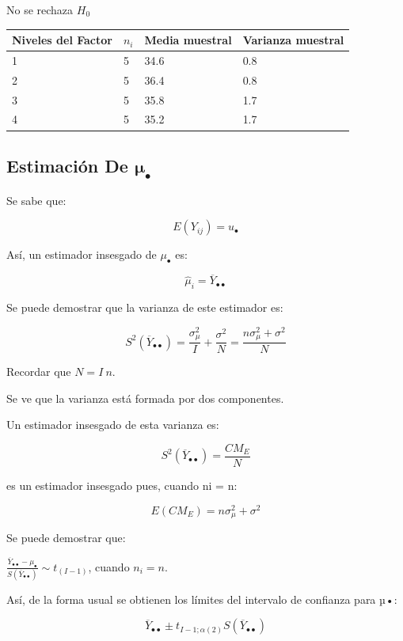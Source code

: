 \documentclass[]{book}
\theoremstyle{definition}
\theoremstyle{definition}
\theoremstyle{definition}
\theoremstyle{remark}
\begin{document}
No se rechaza \(H_0\)

\begin{longtable}[]{@{}llll@{}}
\toprule
Niveles del Factor & \(n_{i}\) & Media muestral & Varianza
muestral\tabularnewline
\midrule
\endhead
1 & 5 & 34.6 & 0.8\tabularnewline
2 & 5 & 36.4 & 0.8\tabularnewline
3 & 5 & 35.8 & 1.7\tabularnewline
4 & 5 & 35.2 & 1.7\tabularnewline
\bottomrule
\end{longtable}

\hypertarget{estimacion-de-mathbfmu_mathbfbullet}{%
\subsection{\texorpdfstring{Estimación De
\(\mathbf{\mu}_{\mathbf{\bullet}}\)}{Estimación De \textbackslash{}mathbf\{\textbackslash{}mu\}\_\{\textbackslash{}mathbf\{\textbackslash{}bullet\}\}}}\label{estimacion-de-mathbfmu_mathbfbullet}}

Se sabe que:

\[
E(Y_{ij}) = u_{\bullet}
\]

Así, un estimador insesgado de \(\mu_{\bullet}\) es:

\[
{\hat{\mu}}_{i} = {\overline{Y}}_{\bullet\bullet}
\]

Se puede demostrar que la varianza de este estimador es:

\[
S^{2}\left( {\overline{Y}}_{\bullet\bullet} \right) = \frac{\sigma_{\mu}^{2}}{I} + \frac{\sigma^{2}}{N} = \frac{n\sigma_{\mu}^{2} + \sigma^{2}}{N}
\]

Recordar que \(N = I\ n.\)

Se ve que la varianza está formada por dos componentes.

Un estimador insesgado de esta varianza es:

\[
S^{2}\left( {\overline{Y}}_{\bullet\bullet} \right) = \frac{CM_E}{N}
\]

es un estimador insesgado pues, cuando ni = n:

\[
E\left( CM_E \right) = n\sigma_{\mu}^{2} + \sigma^{2}
\]

Se puede demostrar que:

\(\frac{{\overline{Y}}_{\bullet\bullet} - \mu_{\bullet}}{S\left( {\overline{Y}}_{\bullet\bullet} \right)}\sim t_{\left( I - 1 \right)}\),
cuando \(n_{i} = n.\)

Así, de la forma usual se obtienen los límites del intervalo de
confianza para µ•:

\[
{\overline{Y}}_{\bullet\bullet} \pm t_{I - 1;\alpha\left( 2 \right)}S\left( {\overline{Y}}_{\bullet\bullet} \right)
\]
\end{document}
